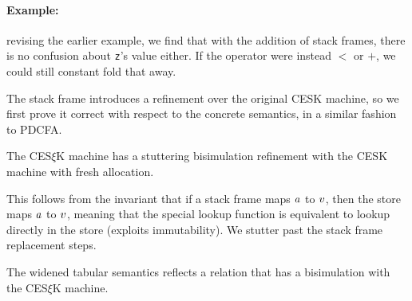 
\paragraph{Example:} revising the earlier example, we find that with the addition of stack frames, there is no confusion about \texttt{z}'s value either.
%
If the operator were instead $<$ or $+$, we could still constant fold that away.

The stack frame introduces a refinement over the original CESK machine, so we first prove it correct with respect to the concrete semantics, in a similar fashion to PDCFA.
%
\begin{theorem}\label{thm:refinement}
  The CES$\xi$K machine has a stuttering bisimulation refinement with the CESK machine with fresh allocation.
\end{theorem}
This follows from the invariant that if a stack frame maps $a$ to $v$, then the store maps $a$ to $v$, meaning that the special lookup function is equivalent to lookup directly in the store (exploits immutability).
%
We stutter past the stack frame replacement steps.
%
%
%
%
%

\begin{theorem}\label{thm:cfa2}
  The widened tabular semantics reflects a relation that has a bisimulation with the CES$\xi$K machine.
\end{theorem}

